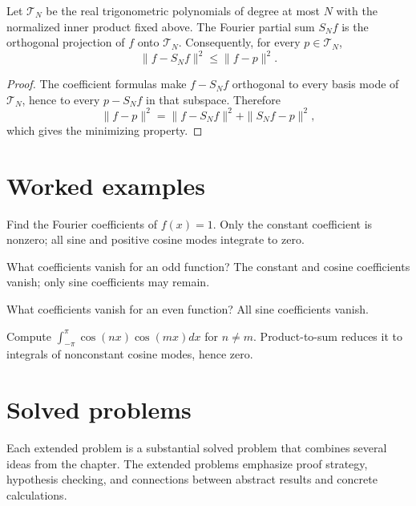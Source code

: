 \begin{theorem}\label{thm:ii14-04}
Let $\mathcal T_N$ be the real trigonometric polynomials of degree at most $N$ with the normalized inner product fixed above. The Fourier partial sum $S_Nf$ is the orthogonal projection of $f$ onto $\mathcal T_N$. Consequently, for every $p\in\mathcal T_N$,
\[
\|f-S_Nf\|^2\le\|f-p\|^2.
\]
\begin{proof}
The coefficient formulas make $f-S_Nf$ orthogonal to every basis mode of $\mathcal T_N$, hence to every $p-S_Nf$ in that subspace. Therefore
\[
\|f-p\|^2=\|f-S_Nf\|^2+\|S_Nf-p\|^2,
\]
which gives the minimizing property.
\end{proof}
\end{theorem}

\section{Worked examples}

\begin{example}\label{ex:ii14-worked-01}
Find the Fourier coefficients of $f(x)=1$. Only the constant coefficient is nonzero; all sine and positive cosine modes integrate to zero.
\end{example}

\begin{example}\label{ex:ii14-worked-02}
What coefficients vanish for an odd function? The constant and cosine coefficients vanish; only sine coefficients may remain.
\end{example}

\begin{example}\label{ex:ii14-worked-03}
What coefficients vanish for an even function? All sine coefficients vanish.
\end{example}

\begin{example}\label{ex:ii14-worked-04}
Compute $\int_{-\pi}^{\pi}\cos(nx)\cos(mx)dx$ for $n\ne m$. Product-to-sum reduces it to integrals of nonconstant cosine modes, hence zero.
\end{example}

\section{Solved problems}
Each extended problem is a substantial solved problem that combines several ideas from the chapter. The extended problems emphasize proof strategy, hypothesis checking, and connections between abstract results and concrete calculations.

